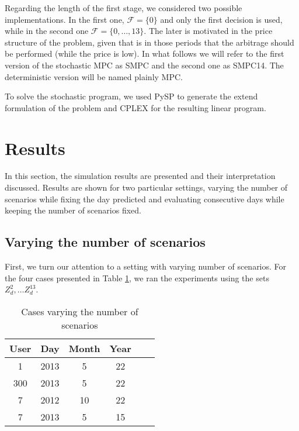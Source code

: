 \documentclass[11pt]{article}
\theoremstyle{definition}
\begin{document}
Regarding the length of the first stage, we considered two possible implementations. In the first one, $\mathcal{F} = \{0\}$ and only the first decision is used, while in the second one $\mathcal{F} = \{0, \dots, 13 \}$. The later is motivated in the price structure of the problem, given that is in those periods that the arbitrage should be performed (while the price is low). In what follows we will refer to the first version of the stochastic MPC as SMPC and the second one as SMPC14. The deterministic version will be named plainly MPC.

To solve the stochastic program, we used PySP \cite{pysp} to generate the extend formulation of the problem and CPLEX for the resulting linear program.

\section{Results}

In this section, the simulation results are presented and their interpretation discussed. Results are shown for two particular settings, varying the number of scenarios while fixing the day predicted and evaluating consecutive days while keeping the number of scenarios fixed.

\subsection{Varying the number of scenarios}

First, we turn our attention to a setting with varying number of scenarios. For the four cases presented in Table \ref{tab:cases1}, we ran the experiments using the sets $Z^2_d, \dots Z^{13}_d$.

\begin{table}[htpb]
  \centering
  \caption{Cases varying the number of scenarios}
  \label{tab:cases1}
  \begin{tabular}{|c|c|c|c|c|c|}
    \hline
    User & Day & Month & Year \\
    \hline
    1 & 2013 & 5 & 22 \\
    \hline
    300 & 2013 & 5 & 22 \\
    \hline
    7 & 2012 & 10 & 22 \\
    \hline
    7 & 2013 & 5 & 15 \\
    \hline
  \end{tabular}
\end{table}
\end{document}
